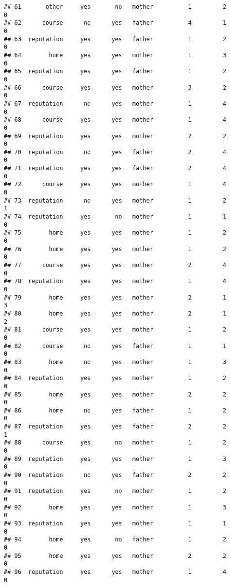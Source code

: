 \documentclass[]{article}
\begin{document}
\begin{verbatim}
## 61       other     yes       no   mother          1         2        0
## 62      course      no      yes   father          4         1        0
## 63  reputation     yes      yes   father          1         2        0
## 64        home     yes      yes   mother          1         3        0
## 65  reputation     yes      yes   father          1         2        0
## 66      course     yes      yes   mother          3         2        0
## 67  reputation      no      yes   mother          1         4        0
## 68      course     yes      yes   mother          1         4        0
## 69  reputation     yes      yes   mother          2         2        0
## 70  reputation      no      yes   father          2         4        0
## 71  reputation     yes      yes   father          2         4        0
## 72      course     yes      yes   mother          1         4        0
## 73  reputation      no      yes   mother          1         2        1
## 74  reputation     yes       no   mother          1         1        0
## 75        home     yes      yes   mother          1         2        0
## 76        home     yes      yes   mother          1         2        0
## 77      course     yes      yes   mother          2         4        0
## 78  reputation     yes      yes   mother          1         4        0
## 79        home     yes      yes   mother          2         1        3
## 80        home     yes      yes   mother          2         1        2
## 81      course     yes      yes   mother          1         2        0
## 82      course      no      yes   father          1         1        0
## 83        home      no      yes   mother          1         3        0
## 84  reputation     yes      yes   mother          1         2        0
## 85        home     yes      yes   mother          2         2        0
## 86        home      no      yes   father          1         2        0
## 87  reputation     yes      yes   father          2         2        1
## 88      course     yes       no   mother          1         2        0
## 89  reputation     yes      yes   mother          1         3        0
## 90  reputation      no      yes   father          2         2        0
## 91  reputation     yes       no   mother          1         2        0
## 92        home     yes      yes   mother          1         3        0
## 93  reputation     yes      yes   mother          1         1        0
## 94        home     yes       no   father          1         2        0
## 95        home     yes      yes   mother          2         2        0
## 96  reputation     yes      yes   mother          1         4        0

\end{verbatim}
\end{document}
